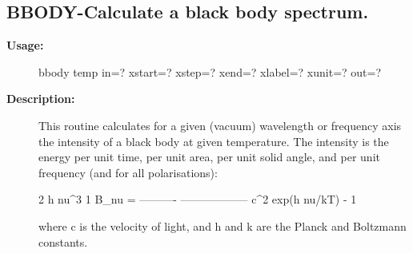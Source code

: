 \subsection{BBODY-\label{BBODY}Calculate a black body spectrum.}
\begin{description}

\item [\textbf{Usage:}]

   bbody temp in=? xstart=? xstep=? xend=? xlabel=? xunit=? out=?


\item [\textbf{Description:}]

   This routine calculates for a given (vacuum) wavelength or
   frequency axis the intensity of a black body at given temperature.
   The intensity is the energy per unit time, per unit area, per unit
   solid angle, and per unit frequency (and for all polarisations):
\begin{terminalv}
           2 h nu^3          1
   B_nu = ---------- ------------------
              c^2     exp(h nu/kT) - 1
\end{terminalv}
   where c is the velocity of light, and h and k are the
   Planck and Boltzmann constants.


\end{description}
